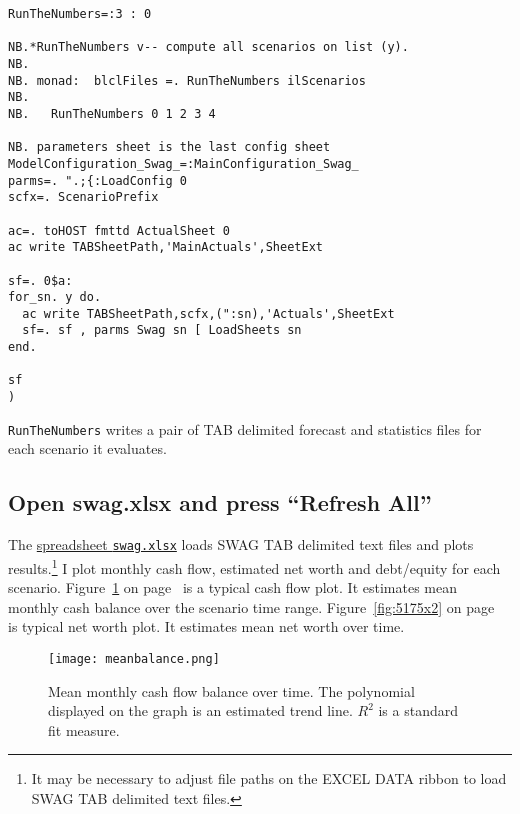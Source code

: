 \begin{tcolorbox}[breakable, size=fbox, boxrule=1pt, pad at break*=1mm,colback=cellbackground, colframe=cellborder]
\begin{lstlisting}[language=jdoc, frame=single,framerule=0pt,label=lst:scr5175X0]
RunTheNumbers=:3 : 0

NB.*RunTheNumbers v-- compute all scenarios on list (y).
NB.
NB. monad:  blclFiles =. RunTheNumbers ilScenarios
NB.
NB.   RunTheNumbers 0 1 2 3 4

NB. parameters sheet is the last config sheet
ModelConfiguration_Swag_=:MainConfiguration_Swag_
parms=. ".;{:LoadConfig 0
scfx=. ScenarioPrefix

ac=. toHOST fmttd ActualSheet 0
ac write TABSheetPath,'MainActuals',SheetExt

sf=. 0$a:
for_sn. y do.
  ac write TABSheetPath,scfx,(":sn),'Actuals',SheetExt
  sf=. sf , parms Swag sn [ LoadSheets sn
end.

sf 
)
\end{lstlisting}
\end{tcolorbox}

\noindent \texttt{RunTheNumbers} writes a pair of TAB delimited forecast and
statistics files for each scenario it evaluates.

\subsection*{Open swag.xlsx and press ``Refresh All''}

The \href{https://github.com/bakerjd99/jacks/blob/master/swag/swag.xlsx}{spreadsheet \texttt{swag.xlsx}} 
loads SWAG TAB delimited text files
and plots results.\footnote{It may be necessary to adjust file paths on
  the EXCEL DATA ribbon to load SWAG TAB delimited text files.} I plot
monthly cash flow, estimated net worth and debt/equity for each
scenario. Figure~\ref{fig:5175x1} on page~\pageref{fig:5175x1} is a typical cash flow plot. It estimates mean
monthly cash balance over the scenario time range. Figure~\ref{fig:5175x2} on page~\pageref{fig:5175x2} is typical net worth plot.
It estimates mean net worth over time.


\captionsetup[figure]{labelformat=default}
\begin{figure}[htbp]
\centering
\texttt{[image: meanbalance.png]}
\caption[Mean monthly cash flow balance over time]{Mean monthly cash flow balance over time. The polynomial displayed on
the graph is an estimated trend line. $R^2$ is a standard fit measure.}
\label{fig:5175x1}
\end{figure}

